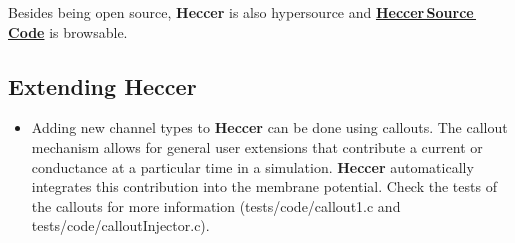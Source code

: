 \documentclass[12pt]{article}
\begin{document}
Besides being open source, {\bf Heccer} is also hypersource and \href{http://repo-genesis3.cbi.utsa.edu/crossref/heccer/heccer/index.html}{\bf Heccer\,Source\,Code} is browsable.

\subsection*{Extending Heccer}
\begin{itemize}
   \item Adding new channel types to {\bf Heccer} can be done using
     callouts.  The callout mechanism allows for general user
     extensions that contribute a current or conductance at a
     particular time in a simulation. {\bf Heccer} automatically
     integrates this contribution into the membrane potential.  Check
     the tests of the callouts for more information
     (tests/code/callout1.c and tests/code/calloutInjector.c).
\end{itemize}
\end{document}
